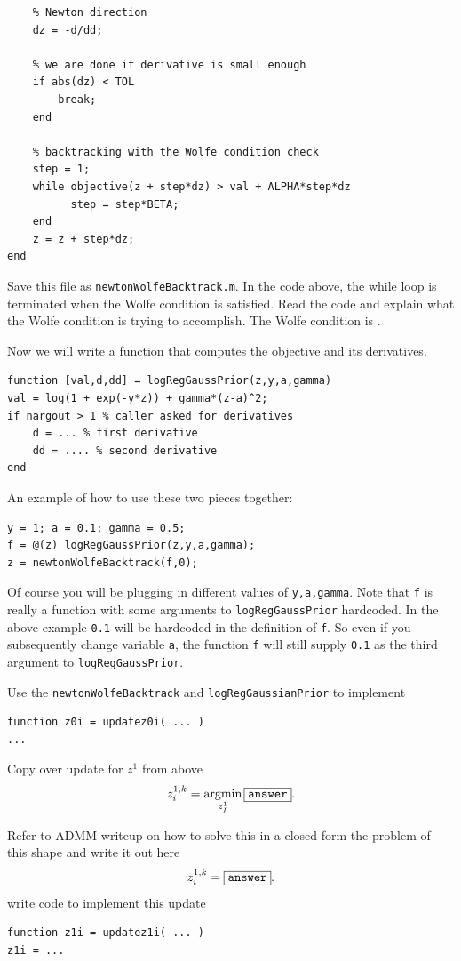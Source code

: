 \documentclass{article}
\begin{document}
{\begin{verbatim}
    % Newton direction
    dz = -d/dd;

    % we are done if derivative is small enough
    if abs(dz) < TOL
        break;
    end

    % backtracking with the Wolfe condition check
    step = 1;
    while objective(z + step*dz) > val + ALPHA*step*dz
          step = step*BETA;
    end
    z = z + step*dz;
end
\end{verbatim}
Save this file as \texttt{newtonWolfeBacktrack.m}. In the code above, the while loop is terminated when the Wolfe condition is satisfied. Read the code and explain what the Wolfe condition is trying to accomplish. The Wolfe condition is \answer.

Now we will write a function that computes the objective and its derivatives.
\begin{verbatim}
function [val,d,dd] = logRegGaussPrior(z,y,a,gamma)
val = log(1 + exp(-y*z)) + gamma*(z-a)^2;
if nargout > 1 % caller asked for derivatives
    d = ... % first derivative
    dd = .... % second derivative
end
\end{verbatim}

An example of how to use these two pieces together:
\begin{verbatim}
y = 1; a = 0.1; gamma = 0.5;
f = @(z) logRegGaussPrior(z,y,a,gamma);
z = newtonWolfeBacktrack(f,0);
\end{verbatim}
Of course you will be plugging in different values of \texttt{y,a,gamma}. Note that \texttt{f} is really a function with some arguments to \texttt{logRegGaussPrior} hardcoded. In the above example \texttt{0.1} will be hardcoded in the definition of \texttt{f}.  So even if you subsequently change variable \texttt{a}, the function \texttt{f} will still supply \texttt{0.1} as the third argument to \texttt{logRegGaussPrior}.

Use the \texttt{newtonWolfeBacktrack} and \texttt{logRegGaussianPrior} to implement
\begin{verbatim}
function z0i = updatez0i( ... )
...
\end{verbatim}

\newproblem{1pt} Copy over update for $z^1$ from above
\[
z_i^{1,k} = \mathop{\rm argmin}_{z_I^1}   \fbox{\tt answer}.
\]

Refer to ADMM writeup on how to solve this in a closed form the problem of this shape and write it out here
\[
z_i^{1,k} = \fbox{\tt answer}.
\]
write code to implement this update
\begin{verbatim}
function z1i = updatez1i( ... )
z1i = ...
\end{verbatim}

}
\end{document}
